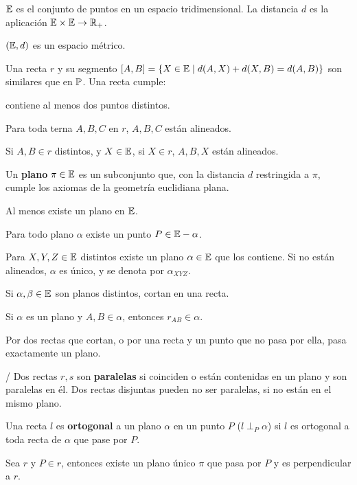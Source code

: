  $\E$ es el conjunto de puntos en un espacio tridimensional. La distancia $d$ es la aplicación $\E \times \E \rightarrow \R_+$.

 $(\E,d)$ es un espacio métrico.

 Una recta $r$ y su segmento $[A,B] = \{X \in \E \;|\; d(A,X) + d(X,B) = d(A,B) \}$ son similares que en $\P$. Una recta cumple:
\begin{itemizex}
	\item contiene al menos dos puntos distintos.
	\item Para toda terna $A,B,C$ en $r$, $A,B,C$ están alineados.
	\item Si $A,B \in r$ distintos, y $X \in \E$, si $X\in r$, $A,B,X$ están alineados.
\end{itemizex} 

 Un \textbf{plano} $\pi \in \E$ es un subconjunto que, con la distancia $d$ restringida a $\pi$, cumple los axiomas de la geometría euclidiana plana.

\begin{itemizex}
	\item Al menos existe un plano en $\E$.
	\item Para todo plano $\alpha$ existe un punto $P \in \E-\alpha$.
	\item Para $X,Y,Z \in \E$ distintos existe un plano $\alpha \in \E$ que los contiene. Si no están alineados, $\alpha$ es único, y se denota por $\alpha_{XYZ}$.
	\item Si $\alpha, \beta \in \E$ son planos distintos, cortan en una recta.
\end{itemizex}

 Si $\alpha$ es un plano y $A,B \in \alpha$, entonces $r_{AB} \in \alpha$.

 Por dos rectas que cortan, o por una recta y un punto que no pasa por ella, pasa exactamente un plano.

/ Dos rectas $r,s$ son \textbf{paralelas} si coinciden o están contenidas en un plano y son paralelas en él. Dos rectas disjuntas pueden no ser paralelas, si no están en el mismo plano.

 Una recta $l$ es \textbf{ortogonal} a un plano $\alpha$ en un punto $P$ ($l\perp_P\alpha$) si $l$ es ortogonal a toda recta de $\alpha$ que pase por $P$.
 
  Sea $r$  y $P \in r$, entonces existe un plano único $\pi$ que pasa por $P$ y es perpendicular a $r$.
 
